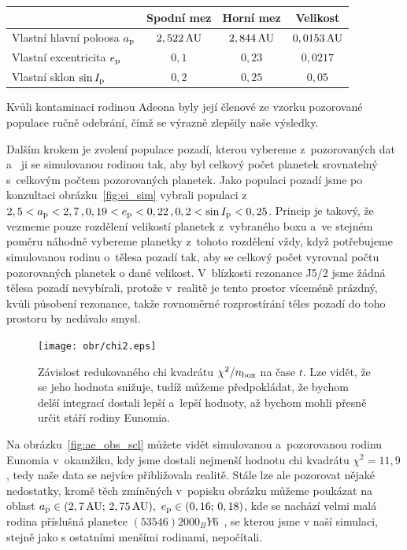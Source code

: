 \documentclass[A4paper, 12pt, oneside]{book}
\begin{document}
\begin{center}
\begin{tabularx}{0.8\textwidth}{|X||c|c|c|}
	\hline
	& Spodní mez & Horní mez & Velikost  \\
	\hline \hline
	Vlastní hlavní poloosa $a_{\rm p}$ & $2,522\,{\rm AU}$ & $2,844\,{\rm AU}$ & $0,0153\,{\rm AU}$ \\
	\hline
	Vlastní excentricita $e_{\rm p}$ & $0,1$ & $0,23$ & $0,0217$ \\
	\hline
	Vlastní sklon $\sin I_{\rm p}$ & $0,2$ & $0,25$ & $0,05$ \\
	\hline
\end{tabularx}
\end{center}

Kvůli kontaminaci rodinou Adeona byly její členové ze vzorku pozorované populace ručně odebrání, čímž se výrazně zlepšily naše výsledky. 

Dalším krokem je zvolení populace pozadí, kterou vybereme z~pozorovaných dat a~ ji se simulovanou rodinou tak, aby byl celkový počet planetek srovnatelný s~celkovým počtem pozorovaných planetek. Jako populaci pozadí jsme po konzultaci obrázku~\ref{fig:ei_sim} vybrali populaci z~$2,5 < a_{\rm p} < 2,7\,, 0,19 < e_{\rm p} < 0,22\,, 0,2 < \sin I_{\rm p} < 0,25$. Princip  je takový, že vezmeme pouze rozdělení velikostí planetek z~vybraného boxu a~ve stejném poměru náhodně vybereme planetky z~tohoto rozdělení vždy, když potřebujeme  simulovanou rodinu o~tělesa pozadí tak, aby se celkový počet vyrovnal počtu pozorovaných planetek o dané velikost. V~blízkosti rezonance J5/2 jsme žádná tělesa pozadí nevybírali, protože v~realitě je tento prostor víceméně prázdný, kvůli působení rezonance, takže rovnoměrné rozprostírání těles pozadí do toho prostoru by nedávalo smysl.

\begin{figure}
	\centering
	\texttt{[image: obr/chi2.eps]}
	\caption{Závislost redukovaného chi kvadrátu $\chi^2/n_{\rm box}$ na čase $t$. Lze vidět, že se jeho hodnota snižuje, tudíž můžeme předpokládat, že bychom delší integrací dostali lepší a~lepší hodnoty, až bychom mohli přesně určit stáří rodiny Eunomia.} \label{fig:chi2}
\end{figure}

Na obrázku~\ref{fig:ae_obs_scl} můžete vidět simulovanou a~pozorovanou rodinu Eunomia v~okamžiku, kdy jsme dostali nejmenší hodnotu chi kvadrátu $\chi^2=11,9$, tedy naše data se nejvíce přibližovala realitě. Stále lze ale pozorovat nějaké nedostatky, kromě těch zmíněných v~popisku obrázku můžeme poukázat na oblast $a_{\rm p}\in(2,7\,{\rm AU};\,2,75\,{\rm AU}),\ e_{\rm p}\in(0,16;\,0,18)$, kde se nachází velmi malá rodina příslušná planetce $(53546) 2000_BY6$~\cite{milani14}, se kterou jsme v naší simulaci, stejně jako s ostatními menšími rodinami, nepočítali.
\end{document}
